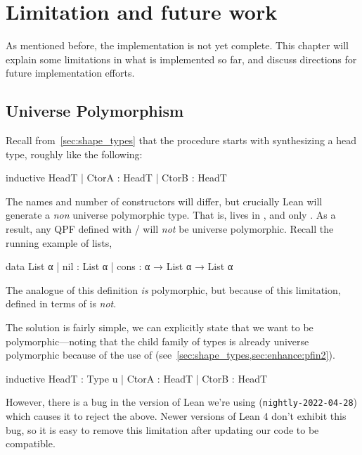 
\chapter{Limitation and future work}%
\label{ch:limitations}


As mentioned before, the implementation is not yet complete.
This chapter will explain some limitations in what is implemented so far, and discuss
directions for future implementation efforts.

\section{Universe Polymorphism}

Recall from~\cref{sec:shape_types} that the procedure starts with synthesizing a head type, roughly like the following:
\begin{leancode}
  inductive HeadT
    | CtorA : HeadT
    | CtorB : HeadT
\end{leancode}
The names and number of constructors will differ, but crucially Lean will generate a \emph{non} universe 
polymorphic type. That is,  lives in , and only .
As a result, any QPF defined with \data{}/\codata{} will \emph{not} be universe polymorphic.
Recall the running example of lists,
\begin{leancode}
  data List α 
    | nil  : List α
    | cons : α → List α → List α
\end{leancode}

The \inductive{} analogue of this definition \emph{is} polymorphic, but because of this limitation,
 defined in terms of \data{} is \emph{not}.
  

The solution is fairly simple, we can explicitly state that we want  to be polymorphic---noting that the child family of types is already universe polymorphic because of the use of  (see~\cref{sec:shape_types,sec:enhance:pfin2}).
\begin{badleancode}

  inductive HeadT : Type u
    | CtorA : HeadT
    | CtorB : HeadT

\end{badleancode}

However, there is a bug in the version of Lean we're using (\texttt{nightly-2022-04-28}) 
which causes it to reject the above. 
Newer versions of Lean 4 don't exhibit this bug, so it is easy to remove this limitation after updating
our code to be compatible.




